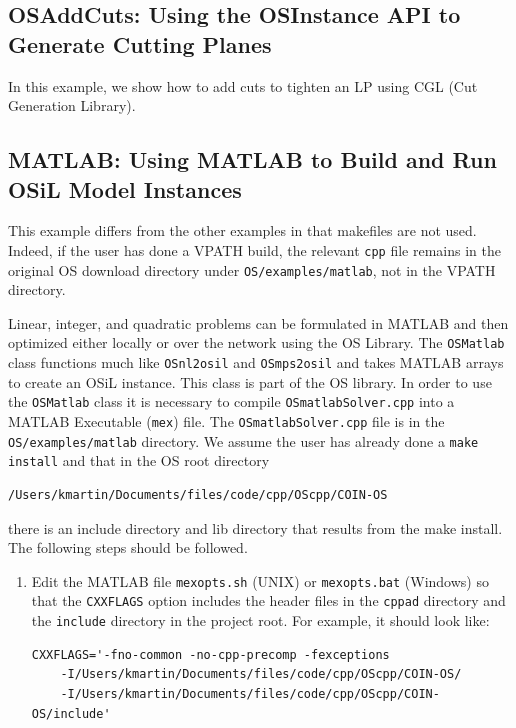 \documentclass[11pt]{article}
\renewcommand{\_}{{\char"5F}}
\renewcommand{\{}{{\char"7B}}
\renewcommand{\}}{{\char"7D}}
\renewcommand{\^}{{\char"0D}}
\renewcommand{\'}{{\char"0D}}
\begin{document}
\begin{enumerate}[Step 1:]
\subsection{OSAddCuts: Using the OSInstance API to Generate Cutting Planes}\label{section:exampleOSAddCuts}

In this example, we show how to add cuts to tighten an LP using CGL (Cut Generation Library).



\subsection{MATLAB:  Using MATLAB to Build and Run OSiL Model Instances}\label{section:usingmatlab}

This example differs from the other examples in that makefiles are not used. 
Indeed, if the user has done a VPATH build, the relevant {\tt cpp} file remains 
in the original OS download directory under {\tt OS/examples/matlab},  
not in the VPATH directory.




Linear, integer, and quadratic problems can be formulated in MATLAB and then optimized 
either locally or over the network using the OS Library. The {\tt OSMatlab} class functions much like 
{\tt OSnl2osil} and {\tt OSmps2osil} 
and takes MATLAB arrays to create an OSiL instance.  This class is part of the OS library.   
In order to use the {\tt OSMatlab} class it is necessary to  compile 
{\tt OSmatlabSolver.cpp}  into  a MATLAB Executable ({\tt mex}) file.  
The {\tt OSmatlabSolver.cpp} file is in the {\tt  OS/examples/matlab} directory.  
We  assume the user has already done a {\tt make install} and that in the OS root directory
\begin{verbatim}
/Users/kmartin/Documents/files/code/cpp/OScpp/COIN-OS
\end{verbatim}
there is an include directory and lib directory that results from the make install.  The following steps should be followed. 


\begin{enumerate}[{\bf Step 1:}]



\item{} Edit the MATLAB file {\tt mexopts.sh} (UNIX) or {\tt mexopts.bat}  (Windows) so that the {\tt CXXFLAGS} option includes the header files in the {\tt cppad} directory and the {\tt include} directory in the project root. For example, it  should look like:
\begin{verbatim}
CXXFLAGS='-fno-common -no-cpp-precomp -fexceptions
    -I/Users/kmartin/Documents/files/code/cpp/OScpp/COIN-OS/
    -I/Users/kmartin/Documents/files/code/cpp/OScpp/COIN-OS/include'
\end{verbatim}


\end{enumerate}
\end{enumerate}
\end{document}
